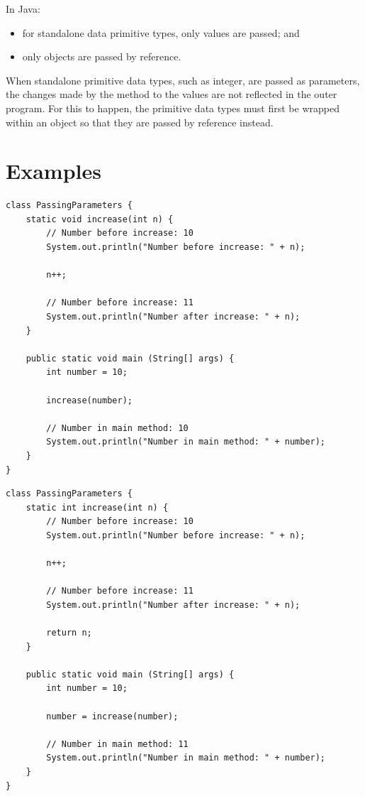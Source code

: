 \documentclass[a4paper]{systems-software}
\begin{document}
In Java:
\begin{itemize}
	\item for standalone data primitive types, only values are passed; and
	\item only objects are passed by reference.
\end{itemize}

When standalone primitive data types, such as integer, are passed as parameters, the changes made by the method to the values are not reflected in the outer program. For this to happen, the primitive data types must first be wrapped within an object so that they are passed by reference instead.


\newpage

\section*{Examples}

\begin{lstlisting}[title={Passing a primitive data type.}]
class PassingParameters {	
	static void increase(int n) {
		// Number before increase: 10
		System.out.println("Number before increase: " + n);
		
		n++;
		
		// Number before increase: 11
		System.out.println("Number after increase: " + n);
	}
	
	public static void main (String[] args) {
		int number = 10;
		
		increase(number);
		
		// Number in main method: 10
		System.out.println("Number in main method: " + number);
	}
}
\end{lstlisting}

\begin{lstlisting}[title={Passing a primitive data type and returning the changed value.}]
class PassingParameters {
	static int increase(int n) {
		// Number before increase: 10
		System.out.println("Number before increase: " + n);
		
		n++;
		
		// Number before increase: 11
		System.out.println("Number after increase: " + n);

		return n;
	}

	public static void main (String[] args) {
		int number = 10;
		
		number = increase(number);
		
		// Number in main method: 11
		System.out.println("Number in main method: " + number);
	}
}
\end{lstlisting}
\end{document}
